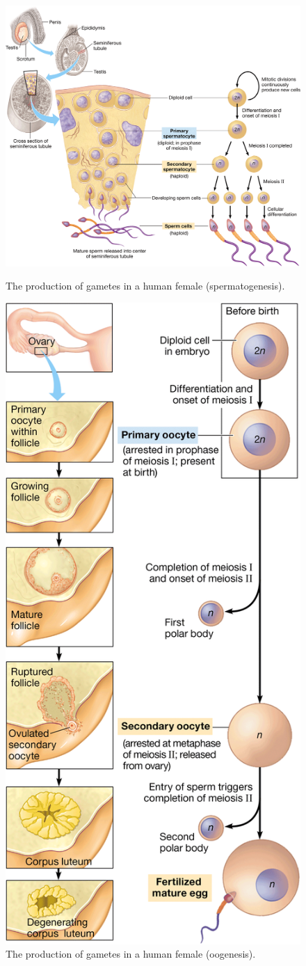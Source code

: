 \documentclass{article}
\begin{document}
\begin{figure}
	\centering
	\includegraphics[width=\linewidth]{spermatogenesis.png}
	\caption{The production of gametes in a human female (spermatogenesis).}

	\bigbreak

	\includegraphics[width=0.4\linewidth]{oogenesis.png}
	\caption{The production of gametes in a human female (oogenesis).}
\end{figure}
\end{document}
